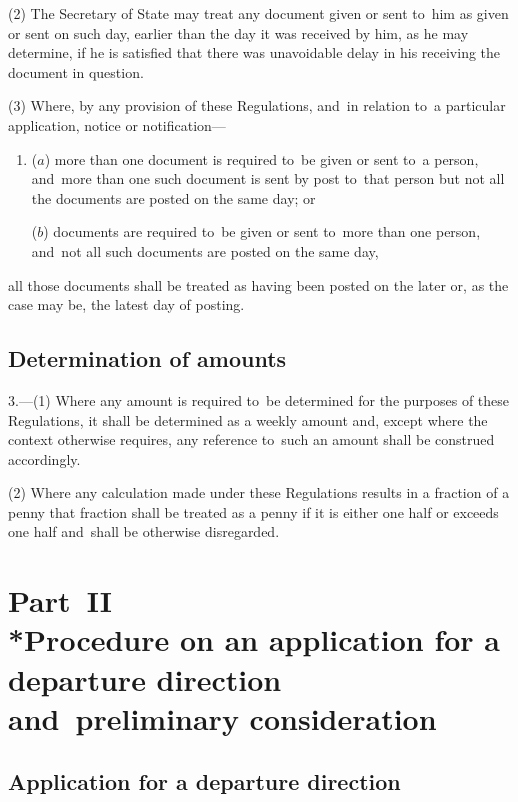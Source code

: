 \documentclass[12pt,a4paper]{article}
\begin{document}
(2) The Secretary of State may treat any document given or sent to~him as given
or sent on such day, earlier than the day it was received by him, as he may
determine, if he is satisfied that there was unavoidable delay in his receiving
the document in question.

(3) Where, by any provision of these Regulations, and~in relation to~a
particular application, notice or notification—
\begin{enumerate}\item[]
($a$) more than one document is required to~be given or sent to~a person, and~more
than one such document is sent by post to~that person but not all the documents
are posted on the same day; or

($b$) documents are required to~be given or sent to~more than one person, and~not
all such documents are posted on the same day,
\end{enumerate}
all those documents shall be treated as having been posted on the later or, as
the case may be, the latest day of posting.

\subsection[3. Determination of amounts]{Determination of amounts}

3.—(1) Where any amount is required to~be determined for
the purposes of these Regulations, it shall be determined as a weekly amount
and, except where the context otherwise requires, any reference to~such an
amount shall be construed accordingly.

(2) Where any calculation made under these Regulations results in a fraction of
a penny that fraction shall be treated as a penny if it is either one half or
exceeds one half and~shall be otherwise disregarded.

\section[Part~II --- Procedure on an application for a departure direction and~preliminary consideration]{Part~II\\*Procedure on an application for a departure direction and~preliminary consideration}

\renewcommand\parthead{--- Part~II}

\subsection[4. Application for a departure direction]{Application for a departure direction}
\end{document}
